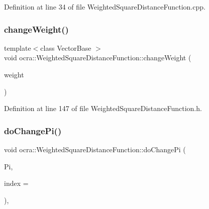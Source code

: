Definition at line 34 of file Weighted\+Square\+Distance\+Function.\+cpp.

\hypertarget{classocra_1_1WeightedSquareDistanceFunction_a8001ac136e0c486571e5523d01e6de38}{}\label{classocra_1_1WeightedSquareDistanceFunction_a8001ac136e0c486571e5523d01e6de38} 
\subsubsection{\texorpdfstring{change\+Weight()}{changeWeight()}\hspace{0.1cm}{\footnotesize\ttfamily [2/2]}}
{\footnotesize\ttfamily template$<$class Vector\+Base $>$ \\
void ocra\+::\+Weighted\+Square\+Distance\+Function\+::change\+Weight (\begin{DoxyParamCaption}\item[{const Vector\+Base \&}]{weight }\end{DoxyParamCaption})\hspace{0.3cm}{\ttfamily [inline]}}



Definition at line 147 of file Weighted\+Square\+Distance\+Function.\+h.

\hypertarget{classocra_1_1WeightedSquareDistanceFunction_a2364e1c3908842eb252128256015d57b}{}\label{classocra_1_1WeightedSquareDistanceFunction_a2364e1c3908842eb252128256015d57b} 
\subsubsection{\texorpdfstring{do\+Change\+Pi()}{doChangePi()}}
{\footnotesize\ttfamily void ocra\+::\+Weighted\+Square\+Distance\+Function\+::do\+Change\+Pi (\begin{DoxyParamCaption}\item[{const Matrix\+Xd \&}]{Pi,  }\item[{int}]{index = {} }\end{DoxyParamCaption})\hspace{0.3cm}{\ttfamily [protected]}, {\ttfamily [virtual]}}




